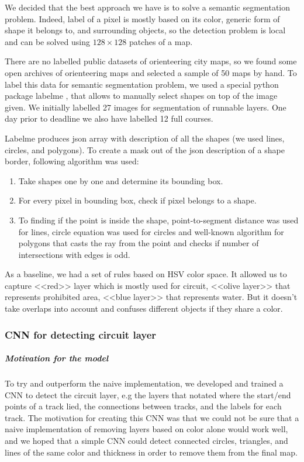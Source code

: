\documentclass[a4paper,12pt]{extarticle}
\begin{document}
We decided that the best approach we have is to solve a semantic segmentation problem.
Indeed, label of a pixel is mostly based on its color, generic form of shape it belongs to, and surrounding objects, so the detection problem is local and can be solved using $128 \times 128$ patches of a map.

There are no labelled public datasets of orienteering city maps, so we found some open archives of orienteering maps and selected a sample of 50 maps by hand.
To label this data for semantic segmentation problem, we used a special python package labelme \cite{labelme}, that allows to manually select shapes on top of the image given.
We initially labelled 27 images for segmentation of runnable layers. One day prior to deadline we also have labelled 12 full courses.

Labelme produces json array with description of all the shapes (we used lines, circles, and polygons).
To create a mask out of the json description of a shape border, following algorithm was used:
\begin{enumerate}
    \item Take shapes one by one and determine its bounding box.
    \item For every pixel in bounding box, check if pixel belongs to a shape.
    \item To finding if the point is inside the shape, point-to-segment distance was used for lines, circle equation was used for circles and well-known algorithm for polygons \cite{pipproblem} that casts the ray from the point and checks if number of intersections with edges is odd.
\end{enumerate}

As a baseline, we had a set of rules based on HSV color space.
It allowed us to capture <<red>> layer which is mostly used for circuit, <<olive layer>> that represents prohibited area, <<blue layer>> that represents water.
But it doesn't take overlaps into account and confuses different objects if they share a color.

\subsubsection{CNN for detecting circuit layer}
\subparagraph{Motivation for the model\\}

To try and outperform the naive implementation, we developed and trained a CNN to detect the circuit layer, e.g the layers that notated where the start/end points of a track lied, the connections between tracks, and the labels for each track.
The motivation for creating this CNN was that we could not be sure that a naive implementation of removing layers based on color alone would work well, and we hoped that a simple CNN could detect connected circles, triangles, and lines of the same color and thickness in order to remove them from the final map. 
\end{document}
